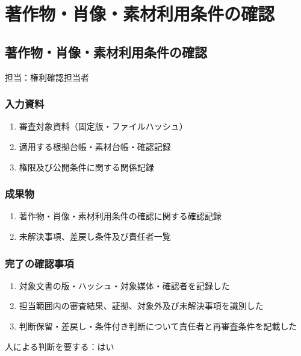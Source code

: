\documentclass[a4paper,11pt]{article}
\begin{document}
\section{著作物・肖像・素材利用条件の確認}
\subsection{著作物・肖像・素材利用条件の確認}
\par 担当：権利確認担当者\par\medskip
\subsubsection*{入力資料}
\begin{enumerate}[leftmargin=2em,itemsep=0.35em]
\item 審査対象資料（固定版・ファイルハッシュ）
\item 適用する根拠台帳・素材台帳・確認記録
\item 権限及び公開条件に関する関係記録
\end{enumerate}
\subsubsection*{成果物}
\begin{enumerate}[leftmargin=2em,itemsep=0.35em]
\item 著作物・肖像・素材利用条件の確認に関する確認記録
\item 未解決事項、差戻し条件及び責任者一覧
\end{enumerate}
\subsubsection*{完了の確認事項}
\begin{enumerate}[leftmargin=2em,itemsep=0.35em]
\item 対象文書の版・ハッシュ・対象媒体・確認者を記録した
\item 担当範囲内の審査結果、証拠、対象外及び未解決事項を識別した
\item 判断保留・差戻し・条件付き判断について責任者と再審査条件を記載した
\end{enumerate}
\par 人による判断を要する：はい\par\medskip
\end{document}
